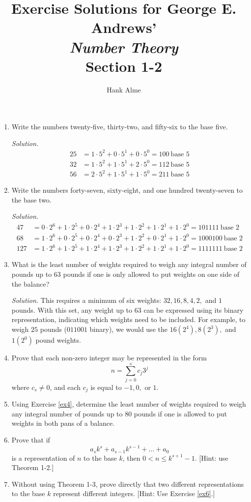 \documentclass[12pt]{article}
\title{Exercise Solutions for George E. Andrews' \\
  {\em Number Theory} \\
Section 1-2}
\author{Hank Alme}
\newcommand\sol[1]{\begin{mdframed}
\emph{Solution.} #1
\end{mdframed}}
\begin{document}
\maketitle

\begin{enumerate}
\item Write the numbers twenty-five, thirty-two, and fifty-six to the base five.

  \sol{
    \begin{align*}
      25 &= 1\cdot5^2 + 0\cdot5^1 + 0\cdot5^0 = 100\ \text{base 5} \\
      32 &= 1\cdot5^2 + 1\cdot5^1 + 2\cdot5^0 = 112\ \text{base 5} \\
      56 &= 2\cdot5^2 + 1\cdot5^1 + 1\cdot5^0 = 211\ \text{base 5}
    \end{align*}
}

  \item Write the numbers forty-seven, sixty-eight, and one hundred
    twenty-seven to the base two.
  \sol{
    \begin{align*}
      47 &= 0\cdot2^6 + 1\cdot2^5 +  0\cdot2^4 +  1\cdot2^3 +  1\cdot2^2 +  1\cdot2^1 +  1\cdot2^0  = 101111\ \text{base 2} \\
      68 &= 1\cdot2^6 +  0\cdot2^5 +  0\cdot2^4 +  0\cdot2^3 +  1\cdot2^2 +  0\cdot2^1 +  1\cdot2^0  = 1000100\ \text{base 2}\\
      127 &= 1\cdot2^6 +  1\cdot2^5 +  1\cdot2^4 +  1\cdot2^3 +  1\cdot2^2 +  1\cdot2^1 +  1\cdot2^0  = 1111111\ \text{base 2}
      \end{align*}
  }

\item What is the least number of weights required to weigh any
  integral number of pounds up to 63 pounds if one is only allowed to
  put weights on one side of the balance?

  \sol{ This requires a minimum of six weights: $32,16,8,4,2,$ and $1$
    pounds. With this set, any weight up to $63$ can be expressed
    using its binary representation, indicating which weights need to
    be included. For example, to weigh $25$ pounds ($011001$ binary),
    we would use the $16 (2^4), 8 (2^3),$ and $1 (2^0)$ pound weights.  }

\item \label{ex4} Prove that each non-zero integer may be represented in the form
  \[
  n = \sum_{j=0}^s c_j3^j
  \]
  where $c_s \ne 0$, and each $c_j$ is equal to $-1,0,$ or $1$.

\item Using Exercise \ref{ex4}, determine the least number of weights required to weigh any integral number of pounds up to 80 pounds if one is allowed to put weights in both pans of a balance.

\item \label{ex6} Prove that if
  \[
  a_sk^s + a_{s-1}k^{s-1} + \ldots + a_0
  \]
  is a representation of $n$ to the base $k$, then $0 < n \le k^{s+1}
  - 1$. [Hint: use Theorem 1-2.]

  \item Without using Theorem 1-3, prove directly that two different representations to the base $k$ represent different integers. [Hint: Use Exercise \ref{ex6}.]
\end{enumerate}
\end{document}
